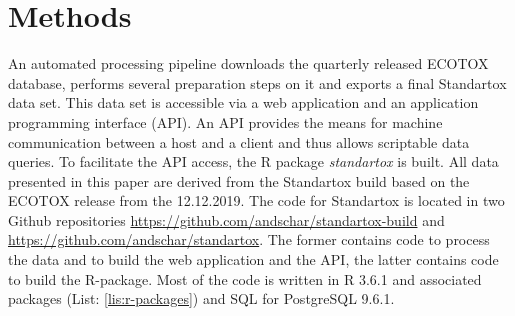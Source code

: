 \documentclass[journal,datadescriptor,accept,moreauthors,pdftex]{Definitions/mdpi}
\begin{document}
\section{Methods}
An automated processing pipeline downloads the quarterly released ECOTOX database, performs several preparation steps on it and exports a final Standartox data set. This data set is accessible via a web application and an application programming interface (API). An API provides the means for machine communication between a host and a client and thus allows scriptable data queries. To facilitate the API access, the R \citep{rcoreteam_language_2017} package \textit{standartox} is built. All data presented in this paper are derived from the Standartox build based on the ECOTOX release from the 12.12.2019. The code for Standartox is located in two Github repositories \url{https://github.com/andschar/standartox-build} and \url{https://github.com/andschar/standartox}. The former contains code to process the data and to build the web application and the API, the latter contains code to build the R-package. Most of the code is written in R 3.6.1 and associated packages (List: \ref{lis:r-packages}) and SQL for PostgreSQL 9.6.1.
\end{document}
